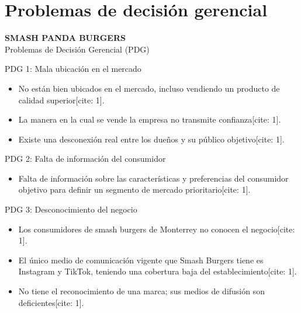 \section{Problemas de decisión gerencial}

\begin{frame}{}
  \vspace{1.5cm}
  \centering
  \Huge \textbf{SMASH PANDA BURGERS} \\
  \vspace{0.5cm}
  \Large Problemas de Decisión Gerencial (PDG)
\end{frame}

\begin{frame}{PDG 1: Mala ubicación en el mercado}
  \vspace{1.5cm}
  \begin{itemize}
    \item No están bien ubicados en el mercado, incluso vendiendo un producto de calidad superior[cite: 1].
    \item La manera en la cual se vende la empresa no transmite confianza[cite: 1].
    \item Existe una desconexión real entre los dueños y su público objetivo[cite: 1].
  \end{itemize}
\end{frame}

\begin{frame}{PDG 2: Falta de información del consumidor}
  \vspace{1.5cm}
  \begin{itemize}
    \item Falta de información sobre las características y preferencias del consumidor objetivo para definir un segmento de mercado prioritario[cite: 1].
  \end{itemize}
\end{frame}

\begin{frame}{PDG 3: Desconocimiento del negocio}
  \vspace{1.5cm}
  \begin{itemize}
    \item Los consumidores de smash burgers de Monterrey no conocen el negocio[cite: 1].
    \item El único medio de comunicación vigente que Smash Burgers tiene es Instagram y TikTok, teniendo una cobertura baja del establecimiento[cite: 1].
    \item No tiene el reconocimiento de una marca; sus medios de difusión son deficientes[cite: 1].
  \end{itemize}
\end{frame}


